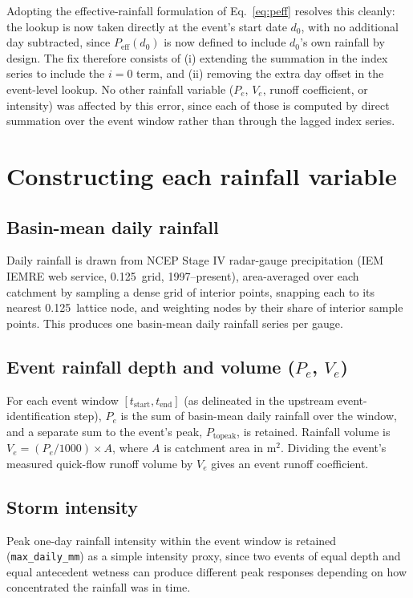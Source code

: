 \documentclass[11pt]{article}
\begin{document}
Adopting the effective-rainfall formulation of Eq.~\eqref{eq:peff} resolves this cleanly: the
lookup is now taken directly at the event's start date $d_0$, with no additional day subtracted,
since $P_{\text{eff}}(d_0)$ is now defined to include $d_0$'s own rainfall by design. The fix
therefore consists of (i) extending the summation in the index series to include the $i=0$ term,
and (ii) removing the extra day offset in the event-level lookup. No other rainfall variable
($P_e$, $V_e$, runoff coefficient, or intensity) was affected by this error, since each of those
is computed by direct summation over the event window rather than through the lagged index
series.

\section{Constructing each rainfall variable}

\subsection{Basin-mean daily rainfall}
Daily rainfall is drawn from NCEP Stage IV radar-gauge precipitation (IEM IEMRE web service,
0.125\textdegree\ grid, 1997--present), area-averaged over each catchment by sampling a dense
grid of interior points, snapping each to its nearest 0.125\textdegree\ lattice node, and
weighting nodes by their share of interior sample points. This produces one basin-mean daily
rainfall series per gauge.

\subsection{Event rainfall depth and volume ($P_e$, $V_e$)}
For each event window $[t_{\text{start}}, t_{\text{end}}]$ (as delineated in the upstream
event-identification step), $P_e$ is the sum of basin-mean daily rainfall over the window, and a
separate sum to the event's peak, $P_{\text{topeak}}$, is retained. Rainfall volume is
$V_e = (P_e / 1000)\times A$, where $A$ is catchment area in m$^2$. Dividing the event's measured
quick-flow runoff volume by $V_e$ gives an event runoff coefficient.

\subsection{Storm intensity}
Peak one-day rainfall intensity within the event window is retained (\texttt{max\_daily\_mm}) as
a simple intensity proxy, since two events of equal depth and equal antecedent wetness can
produce different peak responses depending on how concentrated the rainfall was in time.
\end{document}

